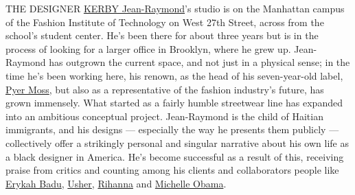 THE DESIGNER
\href{https://www.nytimes3xbfgragh.onion/2018/11/06/t-magazine/derrick-adams-kerby-jean-raymond-pyer-moss.html}{KERBY
Jean-Raymond}'s studio is on the Manhattan campus of the Fashion
Institute of Technology on West 27th Street, across from the school's
student center. He's been there for about three years but is in the
process of looking for a larger office in Brooklyn, where he grew up.
Jean-Raymond has outgrown the current space, and not just in a physical
sense; in the time he's been working here, his renown, as the head of
his seven-year-old label,
\href{https://www.nytimes3xbfgragh.onion/2018/11/06/fashion/kerby-jean-raymond-pyer-moss-cfda-vogue-fashion-fund.html}{Pyer
Moss}, but also as a representative of the fashion industry's future,
has grown immensely. What started as a fairly humble streetwear line has
expanded into an ambitious conceptual project. Jean-Raymond is the child
of Haitian immigrants, and his designs --- especially the way he
presents them publicly --- collectively offer a strikingly personal and
singular narrative about his own life as a black designer in America.
He's become successful as a result of this, receiving praise from
critics and counting among his clients and collaborators people like
\href{https://www.nytimes3xbfgragh.onion/2016/02/13/t-magazine/fashion/erykah-badu-styling-debut-pyer-moss-fashion-week.html}{Erykah
Badu}, \href{https://www.usherworld.com/}{Usher},
\href{https://www.nytimes3xbfgragh.onion/interactive/2019/05/20/t-magazine/rihanna-fenty-louis-vuitton.html}{Rihanna}
and
\href{https://www.nytimes3xbfgragh.onion/2016/10/17/t-magazine/michelle-obama-chimamanda-ngozi-adichie-gloria-steinem-letter.html}{Michelle
Obama}.

